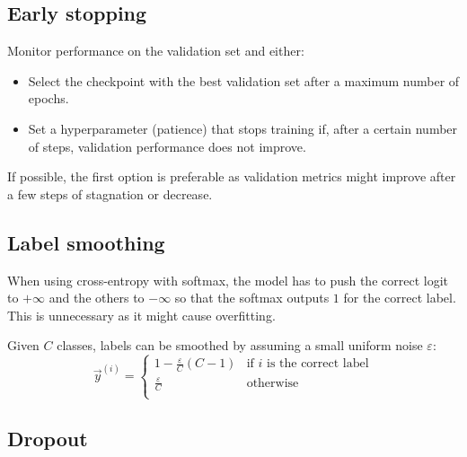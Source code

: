 \subsection{Early stopping}

Monitor performance on the validation set and either:
\begin{itemize}
    \item Select the checkpoint with the best validation set after a maximum number of epochs.
    \item Set a hyperparameter (patience) that stops training if, after a certain number of steps, validation performance does not improve.
\end{itemize}

\begin{remark}
    If possible, the first option is preferable as validation metrics might improve after a few steps of stagnation or decrease.
\end{remark}


\subsection{Label smoothing}

When using cross-entropy with softmax, the model has to push the correct logit to $+\infty$ and the others to $-\infty$ so that the softmax outputs $1$ for the correct label. This is unnecessary as it might cause overfitting.

Given $C$ classes, labels can be smoothed by assuming a small uniform noise $\varepsilon$:
\[
    \vec{y}^{(i)} = \begin{cases}
        1 - \frac{\varepsilon}{C}(C-1) & \text{if $i$ is the correct label} \\
        \frac{\varepsilon}{C} & \text{otherwise} \\
    \end{cases}
\]


\subsection{Dropout}

